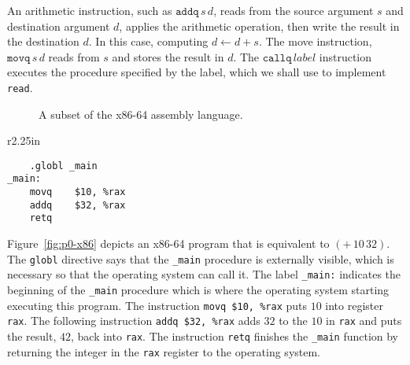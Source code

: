 \documentclass[12pt]{book}
\newcommand{\itm}[1]{\ensuremath{\mathit{#1}}}
\newcommand{\Instr}{\itm{instr}}
\newcommand{\Prog}{\itm{prog}}
\newcommand{\Arg}{\itm{arg}}
\newcommand{\Int}{\itm{int}}
\newcommand{\key}[1]{\texttt{#1}}
\newcommand{\BINOP}[3]{(\key{#1}\,#2\,#3)}
\begin{document}
An arithmetic instruction, such as $\key{addq}\,s\,d$, reads from the
source argument $s$ and destination argument $d$, applies the
arithmetic operation, then write the result in the destination $d$. In
this case, computing $d \gets d + s$.
%
The move instruction, $\key{movq}\,s\,d$ reads from $s$ and stores the
result in $d$. 
%
The $\key{callq}\,\mathit{label}$ instruction executes the procedure
specified by the label, which we shall use to implement
\key{read}. 

\begin{figure}[tbp]
\fbox{
\begin{minipage}{0.96\textwidth}
\[
\begin{array}{lcl}
\itm{register} &::=& \key{rsp} \mid \key{rbp} \mid \key{rax} \mid \key{rbx} \mid \key{rcx}
              \mid \key{rdx} \mid \key{rsi} \mid \key{rdi} \mid \\
              && \key{r8} \mid \key{r9} \mid \key{r10}
              \mid \key{r11} \mid \key{r12} \mid \key{r13}
              \mid \key{r14} \mid \key{r15} \\
\Arg &::=&  \key{\$}\Int \mid \key{\%}\itm{register} \mid \Int(\key{\%}\itm{register}) \\ 
\Instr &::=& \key{addq} \; \Arg, \Arg \mid 
      \key{subq} \; \Arg, \Arg \mid 
      \key{imulq} \; \Arg,\Arg \mid 
      \key{negq} \; \Arg \mid \\
  && \key{movq} \; \Arg, \Arg \mid 
      \key{callq} \; \mathit{label} \mid
      \key{pushq}\;\Arg \mid \key{popq}\;\Arg \mid \key{retq} \\
\Prog &::= & \key{.globl \_main}\\
      &    & \key{\_main:} \; \Instr^{+}
\end{array}
\]
\end{minipage}
}
\caption{A subset of the x86-64 assembly language.}
\label{fig:x86-a}
\end{figure}

\begin{wrapfigure}{r}{2.25in}
\begin{lstlisting}
	.globl _main
_main:
	movq	$10, %rax
	addq	$32, %rax
	retq
\end{lstlisting}
\caption{An x86-64 program equivalent to $\BINOP{+}{10}{32}$.}
\label{fig:p0-x86}
\end{wrapfigure}

Figure~\ref{fig:p0-x86} depicts an x86-64 program that is equivalent to
$\BINOP{+}{10}{32}$. The \key{globl} directive says that the
\key{\_main} procedure is externally visible, which is necessary so
that the operating system can call it. The label \key{\_main:}
indicates the beginning of the \key{\_main} procedure which is where
the operating system starting executing this program.  The instruction
\lstinline{movq $10, %rax} puts $10$ into register \key{rax}. The
  following instruction \lstinline{addq $32, %rax} adds $32$ to the
    $10$ in \key{rax} and puts the result, $42$, back into
    \key{rax}. The instruction \key{retq} finishes the \key{\_main}
    function by returning the integer in the \key{rax} register to the
    operating system.
\end{document}
